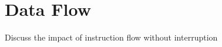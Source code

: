 \section{Data Flow}
\label{sec:data_flow}

Discuss the impact of instruction flow without interruption

